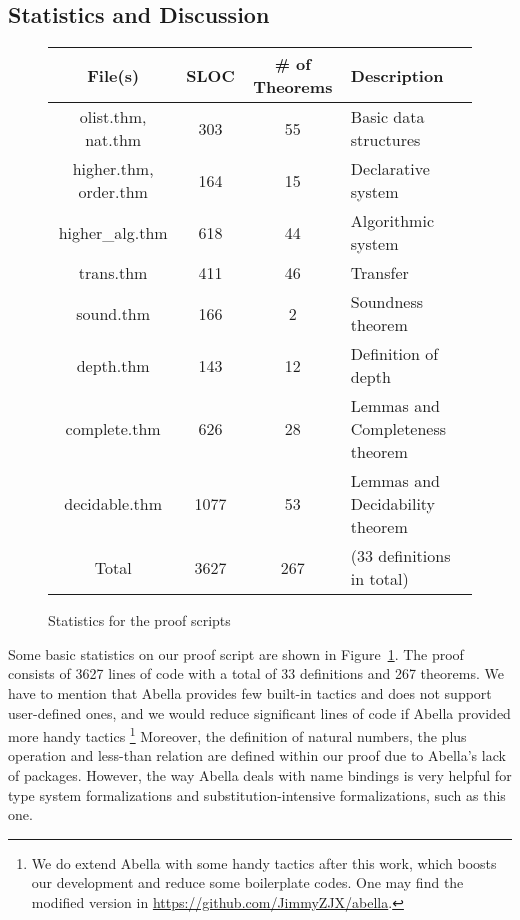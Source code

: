 \subsection{Statistics and Discussion}\label{subsection:discussion}
\begin{figure}[t]
	\centering\begin{tabular}{|c|c|c|l|}\hline
		File(s) & SLOC & \# of Theorems & Description\\\hline
		olist.thm, nat.thm      &  303 & 55  & Basic data structures\\\hline
		higher.thm, order.thm   &  164 & 15  & Declarative system\\\hline
		higher\_alg.thm         &  618 & 44  & Algorithmic system\\\hline
		trans.thm               &  411 & 46  & Transfer\\\hline
		sound.thm               &  166 & 2   & Soundness theorem\\\hline
		depth.thm               &  143 & 12  & Definition of depth\\\hline
		complete.thm            &  626 & 28  & Lemmas and Completeness theorem\\\hline
		decidable.thm           & 1077 & 53  & Lemmas and Decidability theorem\\\hline
		Total                   & 3627 & 267 & (33 definitions in total)\\\hline
	\end{tabular}
	\caption{Statistics for the proof scripts}\label{fig:SLOC}
\end{figure}

Some basic statistics on our proof script are shown in Figure~\ref{fig:SLOC}.
The proof consists of 3627 lines of code with a total of 33 definitions and 267 theorems.
We have to mention that Abella provides few built-in tactics and does not support user-defined ones, and we would reduce significant lines of code if Abella provided more handy tactics%
\footnote{We do extend Abella with some handy tactics after this work,
which boosts our development and reduce some boilerplate codes.
One may find the modified version in \url{https://github.com/JimmyZJX/abella}.}
Moreover, the definition of natural numbers, the plus operation and less-than relation are defined within our proof due to Abella's lack of packages.
However, the way Abella deals with name bindings
is very helpful for type system formalizations and substitution-intensive formalizations, such as this one.
